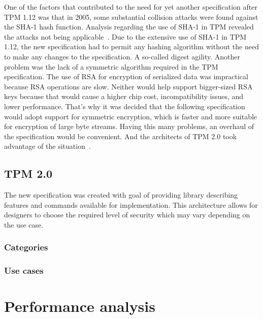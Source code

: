 One of the factors that contributed to the need for yet another specification after TPM 1.12 was that in 2005, some substantial collision attacks were found against the SHA-1 hash function. Analysis regarding the use of SHA-1 in TPM revealed the attacks not being applicable~\cite{tcg_tpm1.12_sha-1_uses}. Due to the extensive use of SHA-1 in TPM 1.12, the new specification had to permit any hashing algorithm without the need to make any changes to the specification. A so-called digest agility. Another problem was the lack of a symmetric algorithm required in the TPM specification. The use of RSA for encryption of serialized data was impractical because RSA operations are slow. Neither would help support bigger-sized RSA keys because that would cause a higher chip cost, incompatibility issues, and lower performance. That's why it was decided that the following specification would adopt support for symmetric encryption, which is faster and more suitable for encryption of large byte streams. Having this many problems, an overhaul of the specification would be convenient. And the architects of TPM 2.0 took advantage of the situation~\cite{arthur2015practical}.

\section{TPM 2.0}
The new specification was created with goal of providing library describing features and commands available for implementation. This architecture allows for designers to choose the required level of security which may vary depending on the use case. 

\subsection{Categories}
\subsection{Use cases}

\chapter{Performance analysis}
